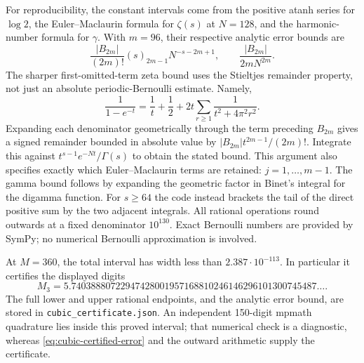 For reproducibility, the constant intervals come from the positive
atanh series for $\log2$, the Euler--Maclaurin formula for $\zeta(s)$ at
$N=128$, and the harmonic-number formula for $\gamma$.  With $m=96$, their
respective analytic error bounds are
\[
 \frac{|B_{2m}|}{(2m)!}(s)_{2m-1}N^{-s-2m+1},\qquad
 \frac{|B_{2m}|}{2mN^{2m}}.
\]
The sharper first-omitted-term zeta bound uses the Stieltjes remainder
property, not just an absolute periodic-Bernoulli estimate.  Namely,
\[
 \frac1{1-e^{-t}}=\frac1t+\frac12+2t\sum_{r\ge1}
 \frac1{t^2+4\pi^2r^2}.
\]
Expanding each denominator geometrically through the term preceding
$B_{2m}$ gives a signed remainder bounded in absolute value by
$|B_{2m}|t^{2m-1}/(2m)!$.  Integrate this against
$t^{s-1}e^{-Nt}/\Gamma(s)$ to obtain the stated bound.  This argument
also specifies exactly which Euler--Maclaurin terms are retained:
$j=1,\ldots,m-1$.
The gamma bound follows by expanding the geometric factor in Binet's
integral for the digamma function.  For $s\ge64$ the code instead brackets
the tail of the direct positive sum by the two adjacent integrals.
All rational operations round outwards at a fixed denominator $10^{130}$.
Exact Bernoulli numbers are provided by SymPy; no numerical Bernoulli
approximation is involved.

At $M=360$, the total interval has width less than $2.387\cdot10^{-113}$.
In particular it certifies the displayed digits
\[
 M_3=5.74038880722947428001957168810246146296101300745487\ldots.
\]
The full lower and upper rational endpoints, and the analytic error bound,
are stored in \texttt{cubic\_certificate.json}.  An independent
150-digit mpmath quadrature lies inside this proved interval; that numerical
check is a diagnostic, whereas \eqref{eq:cubic-certified-error} and the
outward arithmetic supply the certificate.
